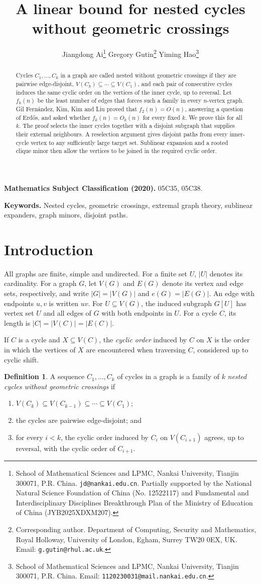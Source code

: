 \documentclass[10pt,letterpaper]{article}
\title{A linear bound for nested cycles without geometric crossings}
\author{Jiangdong Ai\thanks{School of Mathematical Sciences and LPMC, Nankai University, Tianjin 300071, P.R. China. \texttt{jd@nankai.edu.cn}. Partially supported by the National Natural Science Foundation of China (No. 12522117) and Fundamental and Interdisciplinary Disciplines Breakthrough Plan of the Ministry of Education of China (JYB2025XDXM207).}
\quad Gregory Gutin\thanks{Corresponding author. Department of Computing, Security and Mathematics, Royal Holloway, University of London, Egham, Surrey TW20 0EX, UK. Email: \texttt{g.gutin@rhul.ac.uk}.}
\quad Yiming Hao\thanks{School of Mathematical Sciences and LPMC, Nankai University, Tianjin 300071, P.R. China. Email: \texttt{1120230031@mail.nankai.edu.cn}.}}
\date{}
\theoremstyle{definition}
\newtheorem{definition}[theorem]{Definition}
\theoremstyle{remark}
\begin{document}
\maketitle

\begin{abstract}
Cycles $C_1,\ldots,C_k$ in a graph are called nested without geometric crossings if they are pairwise edge-disjoint, $V(C_k)\subseteq\cdots\subseteq V(C_1)$, and each pair of consecutive cycles induces the same cyclic order on the vertices of the inner cycle, up to reversal. Let $f_k(n)$ be the least number of edges that forces such a family in every $n$-vertex graph. Gil Fern\'andez, Kim, Kim and Liu proved that $f_2(n)=O(n)$, answering a question of Erd\H{o}s, and asked whether $f_k(n)=O_k(n)$ for every fixed $k$. We prove this for all $k$. The proof selects the inner cycles together with a disjoint subgraph that supplies their external neighbours. A reselection argument gives disjoint paths from every inner-cycle vertex to any sufficiently large target set. Sublinear expansion and a rooted clique minor then allow the vertices to be joined in the required cyclic order.
\end{abstract}

\noindent\textbf{Mathematics Subject Classification (2020).} 05C35, 05C38.

\smallskip
\noindent\textbf{Keywords.} Nested cycles, geometric crossings, extremal graph theory, sublinear expanders, graph minors, disjoint paths.

\section{Introduction}\label{sec:introduction}

All graphs are finite, simple and undirected. For a finite set $U$, $|U|$ denotes its cardinality. For a graph $G$, let $V(G)$ and $E(G)$ denote its vertex and edge sets, respectively, and write $|G|=|V(G)|$ and $e(G)=|E(G)|$. An edge with endpoints $u,v$ is written $uv$. For $U\subseteq V(G)$, the induced subgraph $G[U]$ has vertex set $U$ and all edges of $G$ with both endpoints in $U$. For a cycle $C$, its length is $|C|=|V(C)|=|E(C)|$.

If $C$ is a cycle and $X\subseteq V(C)$, the \emph{cyclic order} induced by $C$ on $X$ is the order in which the vertices of $X$ are encountered when traversing $C$, considered up to cyclic shift.

\begin{definition}\label{def:nested}
A sequence $C_1,\ldots,C_k$ of cycles in a graph is a family of $k$ \emph{nested cycles without geometric crossings} if
\begin{enumerate}
\item $V(C_k)\subseteq V(C_{k-1})\subseteq\cdots\subseteq V(C_1)$;
\item the cycles are pairwise edge-disjoint; and
\item for every $i<k$, the cyclic order induced by $C_i$ on $V(C_{i+1})$ agrees, up to reversal, with the cyclic order of $C_{i+1}$.
\end{enumerate}
\end{definition}
\end{document}
